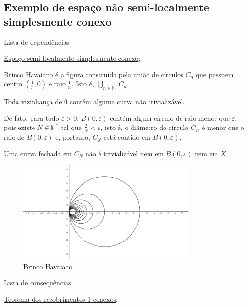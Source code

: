 \subsection{Exemplo de espaço não semi-localmente simplesmente conexo}
\label{não-semi-localmente-simplesmente-conexo-ex}
\begin{titlemize}{Lista de dependências}
	\item \hyperref[espaço-semi-localmente-simplesmente-conexo-def]{Espaço semi-localmente simplesmente conexo};\\ %
\end{titlemize}

\begin{ex}
    Brinco Havaiano é a figura construída pela união de círculos $C_n$ que possuem centro $(\frac{1}{n}, 0)$ e raio $\frac{1}{n}$. Isto é, $\underset{n\in \mathbb{N}^*}{\bigcup} C_n$.
\end{ex}


	Toda vizinhança de $0$ contém alguma curva não trivializável.

    De fato, para todo $\varepsilon>0$, $B(0,\varepsilon)$ contém algum círculo de raio menor que $\varepsilon$, pois existe $N\in \mathbb{N}^*$ tal que $\frac{2}{N}<\varepsilon$, isto é, o diâmetro do círculo $C_N$ é menor que o raio de $B(0,\varepsilon)$ e, portanto, $C_N$ está contido em $B(0,\varepsilon)$. 
    
    Uma curva fechada em $C_N$ não é trivializável nem em $B(0,\varepsilon)$ nem em $X$


\begin{figure}[h!]
    \centering
    \includegraphics[width=0.8\textwidth]{conteudo/fig-brinco-havaiano.png}
	\caption{Brinco Havaiano}
	\label{fig: brinco havaiano}
\end{figure}





\begin{titlemize}{Lista de consequências}
	\item \hyperref[recobrimento-1-conexo-prop]{Teorema dos recobrimentos 1-conexos};\\ %
\end{titlemize}

